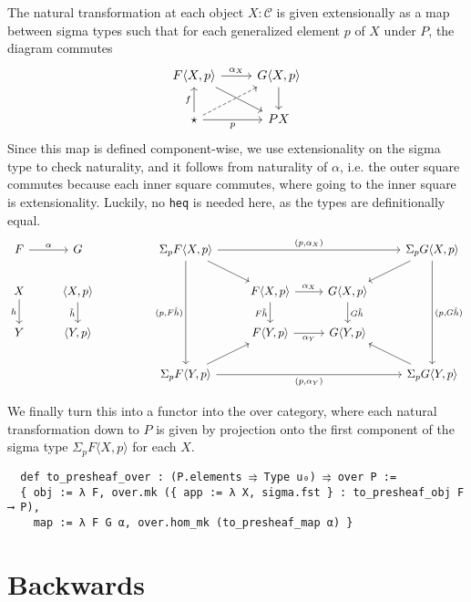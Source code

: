 \documentclass{article}
\newcommand{\al}{\alpha}
\newcommand{\CC}{\mathcal{C}}
\newcommand{\<}{\langle}
\renewcommand{\>}{\rangle}
\theoremstyle{definitionstyle}
\theoremstyle{exercisestyle}
\theoremstyle{remarkstyle}
\begin{document}
The natural transformation at each object $X : \CC$ is
given extensionally as a map between sigma types such that for each
generalized element $p$ of $X$ under $P$, the diagram commutes
\[\begin{tikzcd}
	{F \< X , p \>} & {G\<X,p\>} \\
	\star & PX
	\arrow["{\alpha _X}", from=1-1, to=1-2]
	\arrow["f", from=2-1, to=1-1]
	\arrow["p"', from=2-1, to=2-2]
	\arrow[from=1-2, to=2-2]
	\arrow[from=1-1, to=2-2]
	\arrow[dashed, from=2-1, to=1-2]
\end{tikzcd}\]
Since this map is defined component-wise,
we use extensionality on the sigma type to check naturality,
and it follows from naturality of $\al$,
i.e. the outer square commutes because each inner square commutes,
where going to the inner square is extensionality.
Luckily, no \texttt{heq} is needed here, as the types are definitionally equal.
\[\begin{tikzcd}
	F & G && {\Sigma_p F\<X,p\>} &&& {\Sigma_p G\<X,p\>} \\
	X & {\< X , p \>} &&& {F\<X,p\>} & {G\<X,p\>} \\
	Y & {\< Y , p \>} &&& {F\<Y,p\>} & {G\<Y,p\>} \\
	&&& {\Sigma_p F\<Y,p\>} &&& {\Sigma_p G\<Y,p\>}
	\arrow["h"', from=2-1, to=3-1]
	\arrow["{\tilde{h}}"', from=2-2, to=3-2]
	\arrow["\alpha", from=1-1, to=1-2]
	\arrow["{(p,\alpha_X)}", from=1-4, to=1-7]
	\arrow["{(p,F \tilde{h})}"', from=1-4, to=4-4]
	\arrow["{(p,\alpha_Y)}"', from=4-4, to=4-7]
	\arrow["{(p,G \tilde{h})}", from=1-7, to=4-7]
	\arrow["{\alpha_X}", from=2-5, to=2-6]
	\arrow["{F \tilde{h}}"', from=2-5, to=3-5]
	\arrow["{\alpha_Y}"', from=3-5, to=3-6]
	\arrow["{G \tilde{h}}", from=2-6, to=3-6]
	\arrow[from=4-4, to=3-5]
	\arrow[from=1-4, to=2-5]
	\arrow[from=1-7, to=2-6]
	\arrow[from=4-7, to=3-6]
\end{tikzcd}\]

We finally turn this into a functor into the over category,
where each natural transformation down to $P$ is given by projection
onto the first component of the sigma type $\Sigma_{p} F \< X , p \>$ for each $X$.

\begin{lstlisting}
  def to_presheaf_over : (P.elements ⥤ Type u₀) ⥤ over P :=
  { obj := λ F, over.mk ({ app := λ X, sigma.fst } : to_presheaf_obj F ⟶ P),
    map := λ F G α, over.hom_mk (to_presheaf_map α) } \end{lstlisting}

\section{Backwards}
\end{document}
